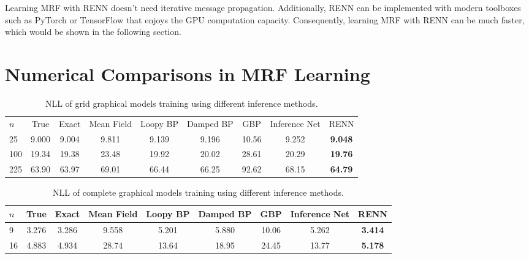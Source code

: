 Learning MRF with RENN doesn't need iterative message propagation. Additionally, RENN can be implemented with modern toolboxes such as PyTorch or TensorFlow that enjoys the GPU computation capacity. Consequently, learning MRF with RENN can be much faster, which would be shown in the following section.


\section{Numerical Comparisons in MRF Learning}

\begin{table*}[t]
  \caption{NLL of grid graphical models training using different inference methods.}
  \label{tab:nll-training-grid-n5n10}
  \begin{center}
    \begin{small}
      \setlength\tabcolsep{2pt}
      \begin{tabular}{lcccccccc}
        \toprule
        $n$ & True & Exact & Mean Field & Loopy BP & Damped BP & GBP & Inference Net & RENN \\
        25  &  9.000  &  9.004  &  9.811  &  {9.139}  &  9.196  &  10.56  &  9.252  &  \textbf{9.048}  \\
        100 &  19.34  &  19.38  &  23.48  &  {19.92}  &  20.02  &  28.61  &  20.29  &  \textbf{19.76} \\
        225 &  63.90  &  63.97  &  69.01  &  66.44    &  66.25  &  92.62  &  68.15  &  \textbf{64.79}  \\
        \bottomrule
      \end{tabular}
      
    \end{small}
  \end{center}
\end{table*}


\begin{table*}[t]
  \caption{NLL of complete graphical models training using different inference methods.}
  \label{tab:nll-training-full-n3n4}
  \begin{center}
    \begin{small}
      \setlength\tabcolsep{2pt}
      \begin{tabular}{lcccccccc}
        \toprule
        $n$ & True & Exact & Mean Field & Loopy BP & Damped BP & GBP & Inference Net & RENN \\
        \midrule
        9  &  3.276  &  3.286  &  9.558  &  5.201  &  5.880  &  10.06  &  5.262  & \textbf{3.414}  \\
        16  &  4.883  &  4.934  &  28.74  &  13.64  &  18.95  &  24.45  &  13.77  &  \textbf{5.178}  \\
        
        \bottomrule
      \end{tabular}
      
    \end{small}
  \end{center}
\end{table*}

